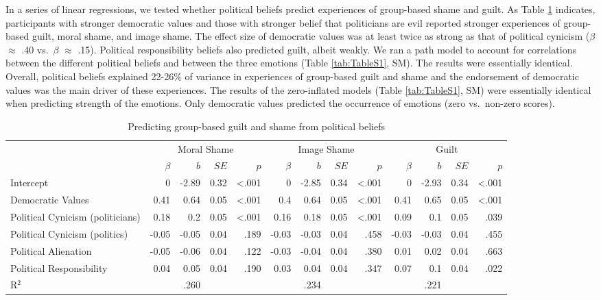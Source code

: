 \documentclass[
]{article}
\begin{document}
In a series of linear regressions, we tested whether political beliefs predict experiences of group-based shame and guilt. As Table \ref{tab:Table1} indicates, participants with stronger democratic values and those with stronger belief that politicians are evil reported stronger experiences of group-based guilt, moral shame, and image shame. The effect size of democratic values was at least twice as strong as that of political cynicism (\(\beta\) \(\approx\) .40 vs.~\(\beta\) \(\approx\) .15). Political responsibility beliefs also predicted guilt, albeit weakly. We ran a path model to account for correlations between the different political beliefs and between the three emotions (Table \ref{tab:TableS1}, SM). The results were essentially identical. Overall, political beliefs explained 22-26\% of variance in experiences of group-based guilt and shame and the endorsement of democratic values was the main driver of these experiences. The results of the zero-inflated models (Table \ref{tab:TableS1}, SM) were essentially identical when predicting strength of the emotions. Only democratic values predicted the occurrence of emotions (zero vs.~non-zero scores).

\begin{table}[H]

\caption{\label{tab:Table1}Predicting group-based guilt and shame from political beliefs}
\centering
\fontsize{8}{10}\selectfont
\begin{tabular}[t]{lrrrrrrrrrrrr}
\toprule
\multicolumn{1}{c}{} & \multicolumn{4}{c}{Moral Shame} & \multicolumn{4}{c}{Image Shame} & \multicolumn{4}{c}{Guilt} \\
\cmidrule(l{3pt}r{3pt}){2-5} \cmidrule(l{3pt}r{3pt}){6-9} \cmidrule(l{3pt}r{3pt}){10-13}
  & $\beta$ & $b$ & $SE$ & $p$ & $\beta$ & $b$ & $SE$ & $p$ & $\beta$ & $b$ & $SE$ & $p$\\
\midrule
Intercept & 0 & -2.89 & 0.32 & <.001 & 0 & -2.85 & 0.34 & <.001 & 0 & -2.93 & 0.34 & <.001\\
Democratic Values & 0.41 & 0.64 & 0.05 & <.001 & 0.4 & 0.64 & 0.05 & <.001 & 0.41 & 0.65 & 0.05 & <.001\\
Political Cynicism (politicians) & 0.18 & 0.2 & 0.05 & <.001 & 0.16 & 0.18 & 0.05 & <.001 & 0.09 & 0.1 & 0.05 & .039\\
Political Cynicism (politics) & -0.05 & -0.05 & 0.04 & .189 & -0.03 & -0.03 & 0.04 & .458 & -0.03 & -0.03 & 0.04 & .455\\
Political Alienation & -0.05 & -0.06 & 0.04 & .122 & -0.03 & -0.04 & 0.04 & .380 & 0.01 & 0.02 & 0.04 & .663\\
\addlinespace
Political Responsibility & 0.04 & 0.05 & 0.04 & .190 & 0.03 & 0.04 & 0.04 & .347 & 0.07 & 0.1 & 0.04 & .022\\
\midrule
R$^{2}$ &  & .260 &  &  &  & .234 &  &  &  & .221 &  & \\
\bottomrule
\end{tabular}
\end{table}
\end{document}
